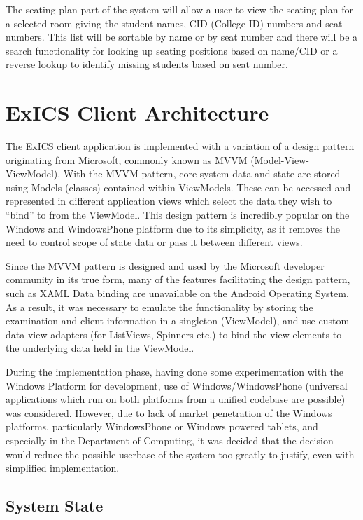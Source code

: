 The seating plan part of the system will allow a user to view the seating plan for a selected room giving the student names, CID (College ID) numbers and seat numbers.  This list will be sortable by name or by seat number and there will be a search functionality for looking up seating positions based on name/CID or a reverse lookup to identify missing students based on seat number.

\section{ExICS Client Architecture}

The ExICS client application is implemented with a variation of a design pattern originating from Microsoft, commonly known as MVVM (Model-View-ViewModel)\cite{mvvm}.  With the MVVM pattern, core system data and state are stored using Models (classes) contained within ViewModels.  These can be accessed and represented in different application views which select the data they wish to ``bind'' to from the ViewModel.  This design pattern is incredibly popular on the Windows and WindowsPhone platform due to its simplicity, as it removes the need to control scope of state data or pass it between different views.

Since the MVVM pattern is designed and used by the Microsoft developer community in its true form, many of the features facilitating the design pattern, such as XAML Data binding\cite{dataBinding} are unavailable on the Android Operating System.  As a result, it was necessary to emulate the functionality by storing the examination and client information in a singleton (ViewModel), and use custom data view adapters (for ListViews, Spinners etc.) to bind the view elements to the underlying data held in the ViewModel.

During the implementation phase, having done some experimentation with the Windows Platform for development, use of Windows/WindowsPhone (universal applications which run on both platforms from a unified codebase are possible) was considered.  However, due to lack of market penetration of the Windows platforms, particularly WindowsPhone or Windows powered tablets, and especially in the Department of Computing, it was decided that the decision would reduce the possible userbase of the system too greatly to justify, even with simplified implementation.

\subsection{System State}

